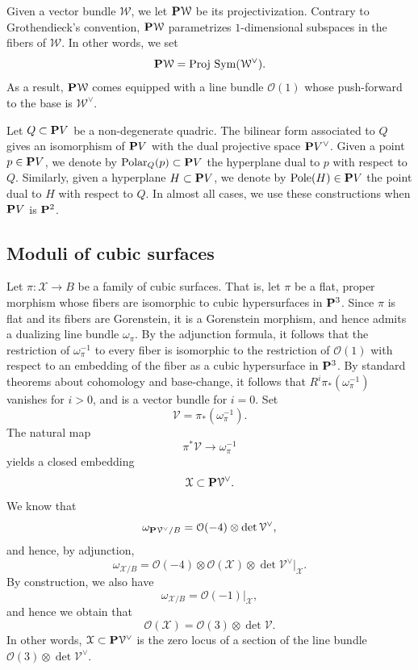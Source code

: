 \documentclass[12pt,reqno]{amsart}
\DeclareMathOperator{\Polar}{Polar}
\DeclareMathOperator{\Pole}{Pole}
\renewcommand{\to}{{\longrightarrow}}
\numberwithin{equation}{section}
\renewcommand{\O}{\mathcal O}
\newcommand{\cX}{\mathcal{X}}
\newcommand{\Proj}{{\text{\rm Proj}\,}}
\begin{document}
Given a vector bundle $\mathcal W$, we let $\P \mathcal W$ be its
projectivization.  Contrary to Grothendieck's convention,
$\P \mathcal W$ parametrizes $1$-dimensional subspaces in the fibers
of $\mathcal W$.  In other words, we set
\[ \P \mathcal W = \Proj \Sym(\mathcal W^\vee).\] As a result,
$\P \mathcal W$ comes equipped with a line bundle $\O(1)$ whose
push-forward to the base is $\mathcal W^\vee$.

Let $Q \subset \P V$ be a non-degenerate quadric.  The bilinear form
associated to $Q$ gives an isomorphism of $\P V$ with the dual
projective space $\P V^\vee$.  Given a point $p \in \P V$, we denote
by $\Polar_Q(p) \subset \P V$ the hyperplane dual to $p$ with respect to
$Q$. Similarly, given a hyperplane $H \subset \P V$, we denote by
$\Pole(H) \in \P V$ the point dual to $H$ with respect to $Q$.  In
almost all cases, we use these constructions when $\P V$ is $\P^2$.

\subsection{Moduli of cubic surfaces}
\label{sec:classical-facts}
Let $\pi \colon \cX \to B$ be a family of cubic surfaces.  That is,
let $\pi$ be a flat, proper morphism whose fibers are isomorphic to
cubic hypersurfaces in $\P^3$.  Since $\pi$ is flat and its fibers are
Gorenstein, it is a Gorenstein morphism, and hence admits a dualizing
line bundle $\omega_\pi$.  By the adjunction formula, it follows that
the restriction of $\omega_{\pi}^{-1}$ to every fiber is isomorphic to
the restriction of $\O(1)$ with respect to an embedding of the fiber
as a cubic hypersurface in $\P^3$.  By standard theorems about
cohomology and base-change, it follows that
$R^i\pi_* \left(\omega_{\pi}^{-1}\right)$ vanishes for $i > 0$, and is
a vector bundle for $i = 0$.  Set
\[ \mathcal V = \pi_* \left( \omega_\pi^{-1} \right).\]
The natural map 
\[ \pi^*\mathcal V \to \omega_{\pi}^{-1}\]
yields a closed embedding
\begin{equation}\label{eqn:relcanx}
  \cX \subset \P \mathcal V^\vee.
\end{equation}
We know that
\[ \omega_{\P \mathcal V^\vee/B} = \O(-4) \otimes \det \mathcal V^\vee,\]
and hence, by adjunction,
\[ \omega_{\cX/B}= \O(-4) \otimes \O(\cX) \otimes \det \mathcal V^\vee |_\cX.\]
By construction, we also have
\[ \omega_{\cX/B} = \O(-1)|_\cX,\]
and hence we obtain that
\begin{equation}\label{eqn:ox}
  \O(\cX) = \O(3) \otimes \det \mathcal V.
\end{equation}
In other words, $\cX \subset \P \mathcal V^\vee$ is the zero locus of
a section of the line bundle $\O(3) \otimes \det \mathcal V^\vee$.
\end{document}
